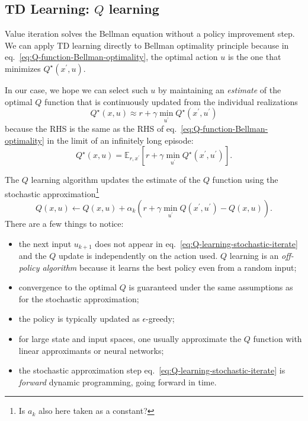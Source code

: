 \subsection{TD Learning: $Q$ learning}
\label{sec:TD-learning-Q-learning}

Value iteration solves the Bellman equation without a policy improvement step. We can apply TD learning directly to Bellman optimality principle because in eq.~\eqref{eq:Q-function-Bellman-optimality}, the optimal action $u$ is the one that minimizes $Q^\star(x^\prime,u)$.

In our case, we hope we can select such $u$ by maintaining an \emph{estimate} of the optimal $Q$ function that is continuously updated from the individual realizations
\begin{equation*}
  Q^\star(x,u) \approx r + \gamma \min_{u^\prime} Q^\star(x^\prime,u^\prime)
\end{equation*}
because the RHS is the same as the RHS of eq.~\eqref{eq:Q-function-Bellman-optimality} in the limit of an infinitely long episode:
\begin{equation*}
  Q^\star(x,u) = \mathbb{E}_{r,x^\prime} \left[r + \gamma \min_{u^\prime} Q^\star(x^\prime,u^\prime)\right].
\end{equation*}

The $Q$ learning algorithm updates the estimate of the $Q$ function using the stochastic approximation\footnote{Is $a_k$ also here taken as a constant?}
\begin{equation}
  \label{eq:Q-learning-stochastic-iterate}
  Q(x,u) \leftarrow Q(x,u) + \alpha_k\left(r + \gamma \min_{u^\prime} Q(x^\prime,u^\prime) - Q(x,u)\right).
\end{equation}
There are a few things to notice:
\begin{itemize}
\item the next input $u_{k+1}$ does not appear in eq.~\eqref{eq:Q-learning-stochastic-iterate} and the $Q$ update is independently on the action used. $Q$ learning is an \emph{off-policy algorithm} because it learns the best policy even from a random input;
\item convergence to the optimal $Q$ is guaranteed under the same assumptions as for the stochastic approximation;
\item the policy is typically updated as $\epsilon$-greedy;
\item for large state and input spaces, one usually approximate the $Q$ function with linear approximants or neural networks;
\item the stochastic approximation step eq.~\eqref{eq:Q-learning-stochastic-iterate} is \emph{forward} dynamic programming, going forward in time.
\end{itemize}

